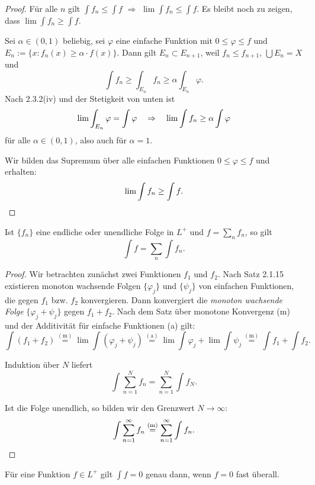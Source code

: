 \documentclass[
 a4paper,
 12pt,
 parskip=half
 ]{scrreprt}
\theoremstyle{plain}
\theoremstyle{definition}
\numberwithin{equation}{section}
\begin{document}
\begin{proof}
 Für alle $n$ gilt $\int f_n \le \int f$ $\Rightarrow$ $\lim \int f_n \le \int f$. Es bleibt noch zu zeigen, dass $\lim \int f_n \ge \int f$. 
 
 Sei $\alpha \in (0,1)$ beliebig, sei $\varphi$ eine einfache Funktion mit $0 \le \varphi \le f$ und $E_n := \{ x : f_n(x) \ge \alpha \cdot f(x) \}$. Dann gilt $E_n \subset E_{n+1}$, weil $f_n \le f_{n+1}$, $\bigcup E_n = X$ und
 \[ \int f_n \ge \int_{E_n} f_n \ge \alpha \int_{E_n} \varphi. \]
 Nach 2.3.2(iv) und der Stetigkeit von unten ist
 \[ \lim \int_{E_n} \varphi = \int \varphi \quad \Rightarrow \quad \lim \int f_n \ge \alpha \int \varphi \]
 für alle $\alpha \in (0,1)$, also auch für $\alpha = 1$. 
 
 Wir bilden das Supremum über alle einfachen Funktionen $0 \le \varphi \le f$ und erhalten:
 \[ \lim \int f_n \ge \int f. \qedhere \]
\end{proof}

\begin{thm}
 Ist $\{ f_n \}$ eine endliche oder unendliche Folge in $L^+$ und $f = \sum_n f_n$, so gilt
 \[ \int f =  \sum_n \int f_n. \]
\end{thm}

\begin{proof}
 Wir betrachten zunächst zwei Funktionen $f_1$ und $f_2$. Nach Satz 2.1.15 existieren monoton wachsende  Folgen $\{ \varphi_j \}$ und $\{ \psi_j \}$ von einfachen Funktionen, die gegen $f_1$ bzw. $f_2$ konvergieren. Dann konvergiert die \emph{monoton wachsende Folge} $\{ \varphi_j + \psi_j \}$ gegen $f_1 + f_2$. Nach dem Satz über monotone Konvergenz (m) und der Additivität für einfache Funktionen (a) gilt:
 \[ \int (f_1 + f_2 ) \overset{(\text{m})}{=} \lim \int (\varphi_j + \psi_j) \overset{(\text{a})}{=} \lim \int \varphi_j + \lim \int \psi_j \overset{(\text{m})}{=} \int f_1 + \int f_2. \]
 
 Induktion über $N$ liefert
 \[ \int \sum_{n=1}^N f_n = \sum_{n=1}^N \int f_N. \]
 
 Ist die Folge unendlich, so bilden wir den Grenzwert $N \to \infty$:
 \[ \int \sum_{n=1}^\infty f_n \overset{(\text{m})}{=} \sum_{n=1}^\infty \int f_n. \qedhere \]
\end{proof}

\begin{thm}
 Für eine Funktion $f \in L^+$ gilt $\int f = 0$ genau dann, wenn $f=0$ fast überall.
\end{thm}
\end{document}
